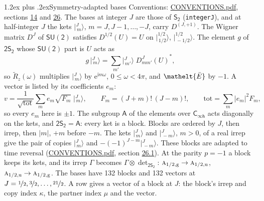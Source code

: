 \documentclass[10pt,a4paper]{article}
\makeatletter
\renewcommand\section{\@startsection{section}{1}{\z@}{-3ex plus -1ex minus -.2ex}%
  {1.2ex plus .2ex}{\normalfont\large\sffamily\bfseries\color{parttitle}}}
\numberwithin{equation}{section}
\newcommand{\eltfont}[1]{{\let\sigma\eltsigma\mathelt{#1}}}
\newcommand{\grp}[1]{\mathsf{#1}}
\newcommand{\irr}[1]{\text{\normalfont\scshape #1}}
\newcommand{\elt}[1]{\eltfont{#1}}
\newcommand{\ptag}[1]{\mathrm{#1}}
\newcommand{\iunit}{\mathrm{i}}
\newcommand{\expe}{\mathrm{e}}
\newcommand{\irrJp}[2]{D^{(#1,#2)}}
\newcommand{\wignerD}[1]{D^{#1}}
\newcommand{\conj}[1]{{#1}^{*}}
\newcommand{\irrprod}{\otimes}
\newcommand{\mult}{\kappa}
\newcommand{\intx}{\mu}
\newcommand{\jm}[2]{\bigl\lvert{}^{#1}_{\,#2}\bigr\rangle}
\newcommand{\barred}[1]{\bar{#1}}
\newcommand{\lift}[1]{\tilde{#1}}
\makeatother
\begin{document}
\section{Symmetry-adapted bases}\label{s:bases}
Conventions: \href{../../CONVENTIONS.pdf}{CONVENTIONS.pdf}, sections \href{../../../rotation/CONVENTIONS.pdf\#conv.14}{14} and \href{../../CONVENTIONS.pdf\#conv.26}{26}.
\leavevmode\label{n:index.m}\label{n:vector.ket}The bases at integer $J$ are those of \href{../../../rotation/data/pdf/S2.pdf}{$\grp{S_{2}}$} (\texttt{integerJ}), and at half-integer $J$ the kets $\jm{J}{m}$, $m = J, J-1, \dots, -J$, carry $\irrJp{J}{+1}$. \label{n:matrix.wigner}The Wigner matrix $\wignerD{J}$ of $\grp{SU(2)}$ satisfies $\wignerD{1/2}(U) = U$ on $\jm{1/2}{1/2}$, $\jm{1/2}{-1/2}$. The element $g$ of $\grp{2S_{2}}$ whose $\grp{SU(2)}$ part is $U$ acts as
\begin{equation}\label{e:action}g\,\jm{J}{m} = \sum_{m'} \jm{J}{m'}\; \conj{\wignerD{J}_{m m'}(U)},\end{equation}
so $\lift{R}_{z}(\omega)$ multiplies $\jm{J}{m}$ by $\expe^{\iunit m\omega}$, $0 \le \omega < 4\pi$, and $\elt{\barred{E}}$ by $-1$. \label{n:index.ketcoefficient}\label{n:vector.basis.symmetry}\label{n:index.ketweight}\label{n:index.total}A vector is listed by its coefficients $e_m$:
\begin{equation}\label{e:ket}v = \frac{1}{\sqrt{\mathrm{tot}}}\sum_m e_m\sqrt{F_m}\;\jm{J}{m},\qquad F_m = (J+m)!\,(J-m)!,\qquad \mathrm{tot} = \sum_m |e_m|^2F_m,\end{equation}
so every $e_m$ here is $\pm 1$.
\leavevmode\label{n:group.A}The subgroup $\grp{A}$ of the elements over $\grp{C_{\infty h}}$ acts diagonally on the kets, and $\grp{2S_{2}} = \grp{A}$: every ket is a block. Blocks are ordered by $J$, then irrep, then $|m|$, $+m$ before $-m$. The kets $\jm{J}{m}$ and $\jm{J}{-m}$, $m > 0$, of a real irrep give the pair of copies $\jm{J}{m}$ and $-(-1)^{J-m}\jm{J}{-m}$. These blocks are adapted to time reversal (\href{../../CONVENTIONS.pdf}{CONVENTIONS.pdf}, section \href{../../CONVENTIONS.pdf\#conv.26.1}{26.1}).
At the parity $p = -1$ a block keeps its kets, and its irrep $\Gamma$ becomes $\Gamma \irrprod \det_{\grp{2S_{2}}}$: $\irr{a}_{1/2,\ptag{g}} \to \irr{a}_{1/2,\ptag{u}}$, $\irr{a}_{1/2,\ptag{u}} \to \irr{a}_{1/2,\ptag{g}}$.
The bases have 132 blocks and 132 vectors at $J = \nicefrac{1}{2}, \nicefrac{3}{2}, \dots, \nicefrac{21}{2}$. \label{n:index.copy}\label{n:head.vector}A row gives a vector of a block at $J$: the block's irrep and copy index $\mult$, the partner index $\intx$ and the vector.
\end{document}
